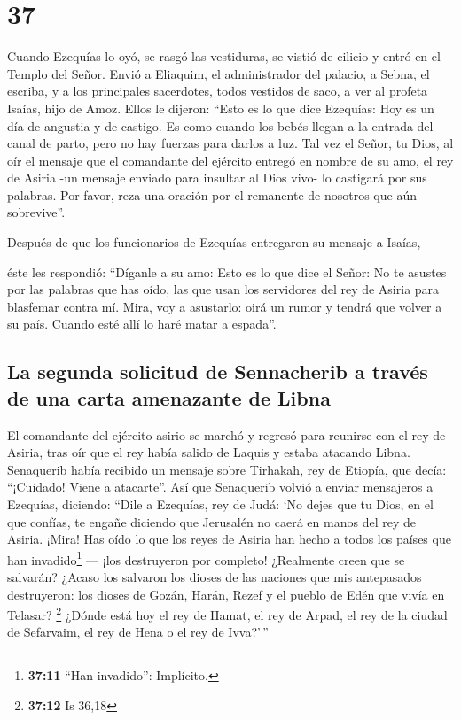 \hypertarget{section-36}{%
\section{37}\label{section-36}}

 Cuando Ezequías lo oyó, se rasgó las vestiduras, se
vistió de cilicio y entró en el Templo del Señor.  Envió a
Eliaquim, el administrador del palacio, a Sebna, el escriba, y a los
principales sacerdotes, todos vestidos de saco, a ver al profeta Isaías,
hijo de Amoz.  Ellos le dijeron: ``Esto es lo que dice
Ezequías: Hoy es un día de angustia y de castigo. Es como cuando los
bebés llegan a la entrada del canal de parto, pero no hay fuerzas para
darlos a luz.  Tal vez el Señor, tu Dios, al oír el
mensaje que el comandante del ejército entregó en nombre de su amo, el
rey de Asiria -un mensaje enviado para insultar al Dios vivo- lo
castigará por sus palabras. Por favor, reza una oración por el remanente
de nosotros que aún sobrevive''.

 Después de que los funcionarios de Ezequías entregaron su
mensaje a Isaías,

 éste les respondió: ``Díganle a su amo: Esto es lo que
dice el Señor: No te asustes por las palabras que has oído, las que usan
los servidores del rey de Asiria para blasfemar contra mí.
 Mira, voy a asustarlo: oirá un rumor y tendrá que volver
a su país. Cuando esté allí lo haré matar a espada''.

\hypertarget{la-segunda-solicitud-de-sennacherib-a-travuxe9s-de-una-carta-amenazante-de-libna}{%
\subsection{La segunda solicitud de Sennacherib a través de una carta
amenazante de
Libna}\label{la-segunda-solicitud-de-sennacherib-a-travuxe9s-de-una-carta-amenazante-de-libna}}

 El comandante del ejército asirio se marchó y regresó
para reunirse con el rey de Asiria, tras oír que el rey había salido de
Laquis y estaba atacando Libna.  Senaquerib había recibido
un mensaje sobre Tirhakah, rey de Etiopía, que decía: ``¡Cuidado! Viene
a atacarte''. Así que Senaquerib volvió a enviar mensajeros a Ezequías,
diciendo:  ``Dile a Ezequías, rey de Judá: `No dejes que
tu Dios, en el que confías, te engañe diciendo que Jerusalén no caerá en
manos del rey de Asiria.  ¡Mira! Has oído lo que los
reyes de Asiria han hecho a todos los países que han invadido\footnote{\textbf{37:11}
  ``Han invadido'': Implícito.} --- ¡los destruyeron por completo!
¿Realmente creen que se salvarán?  ¿Acaso los salvaron
los dioses de las naciones que mis antepasados destruyeron: los dioses
de Gozán, Harán, Rezef y el pueblo de Edén que vivía en Telasar?
\footnote{\textbf{37:12} Is 36,18}  ¿Dónde está hoy el
rey de Hamat, el rey de Arpad, el rey de la ciudad de Sefarvaim, el rey
de Hena o el rey de Ivva?'\,''

